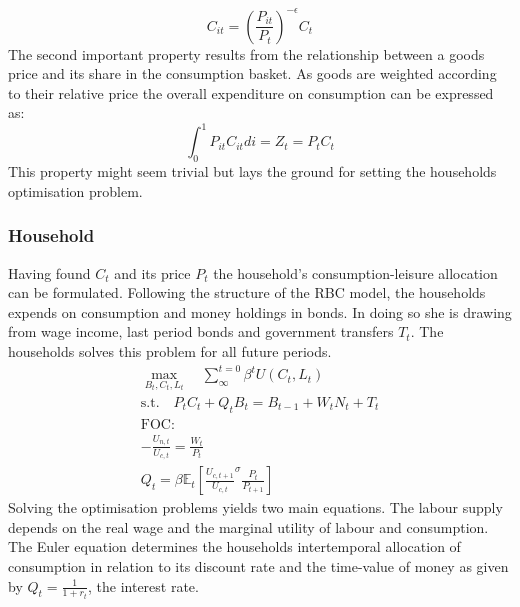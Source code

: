 \documentclass[12pt,a4paper,english]{article} %
\newcommand{\E}{\mathbb{E}} %
\begin{document}
	\begin{equation}
		C_{it} = \left( \frac{P_{it}}{P_t} \right)^{- \epsilon} C_t
	\end{equation}
	The second important property results from the relationship between a goods price and its share in the consumption basket. As goods are weighted according to their relative price the overall expenditure on consumption can be expressed as: 
	\begin{equation}
		\int_{0}^{1} P_{it} C_{it} di = Z_t = P_t C_t
	\end{equation}
	This property might seem trivial but lays the ground for setting the households optimisation problem. 
	
	\subsubsection{Household}
	Having found $C_t$ and its price $P_t$ the household's consumption-leisure allocation can be formulated. Following the structure of the RBC model, the households expends on consumption and money holdings in bonds. In doing so she is drawing from wage income, last period bonds and government transfers $T_t$. The households solves this problem for all future periods.
	\begin{equation}
		\begin{aligned}
			\max_{B_t, C_t, L_t} \quad \sum_{\infty}^{t=0} \beta^{t} U(C_{t}, L_{t}) \\
			\textrm{s.t.} \quad P_t C_t + Q_t B_t = B_{t-1} + W_t N_t + T_t \\
			\textrm{FOC:} \\
				- \frac{U_{n,t}}{U_{c, t}} = \frac{W_t}{P_t}\\
				Q_t = \beta \E_t \left[ \frac{U_{c, t+1}}{U_{c,t}}^\sigma \frac{P_t}{P_{t+1}} \right] 			
		\end{aligned}
	\end{equation}
	Solving the optimisation problems yields two main equations. The labour supply depends on the real wage and the marginal utility of labour and consumption. The Euler equation determines the households intertemporal allocation of consumption in relation to its discount rate and the time-value of money as given by $Q_t = \frac{1}{1+r_t}$, the interest rate.
\end{document}
